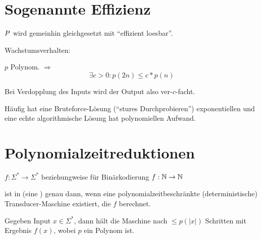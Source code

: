 \section{Sogenannte Effizienz}


$P$ wird gemeinhin gleichgesetzt mit ``effizient loesbar''.
    
Wachstumsverhalten:

  $p$ Polynom. $\Rightarrow$ 
  $$ \exists c > 0:   p(2n) \leq c * p(n) $$

  Bei Verdopplung des Inputs wird der Output also ver-$c$-facht.

  Häufig hat eine Bruteforce-Lösung (``stures Durchprobieren'')
  exponentiellen und eine echte algorithmische Lösung hat polynomiellen Aufwand.













\section{Polynomialzeitreduktionen}



\begin{definition}

    $f : \Sigma^\ast \rightarrow \Sigma^\ast $
    beziehungweise für Binärkodierung
    $f : \mathbb{N} \rightarrow \mathbb{N} $

    ist in  (eine ) genau dann, wenn eine polynomialzeitbeschränkte (deterministische) Transducer-Maschine existiert, die $f$ berechnet.

\end{definition}


Gegeben Input $x \in \Sigma^\ast$, dann hält die Maschine nach $\leq p(|x|)$ Schritten mit Ergebnis $f(x)$, wobei $p$ ein Polynom ist.

